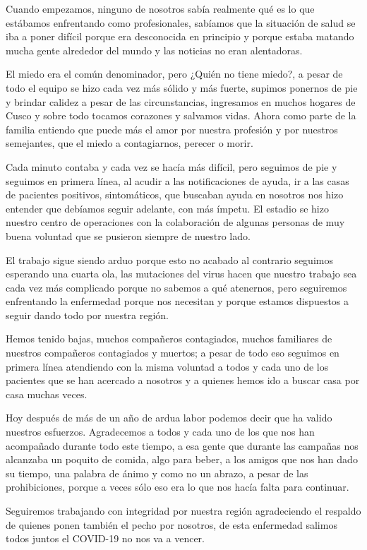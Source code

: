 \documentclass[12pt,a4paper,openany]{book}
\begin{document}
Cuando empezamos, ninguno de nosotros sabía realmente qué es lo que estábamos enfrentando como profesionales, sabíamos que la situación de salud se iba a poner difícil porque era desconocida en principio y porque estaba matando mucha gente alrededor del mundo y las noticias no eran alentadoras. 

El miedo era el común denominador, pero ¿Quién no tiene miedo?, a pesar de todo el equipo se hizo cada vez más sólido y más fuerte, supimos ponernos de pie y brindar calidez a pesar de las circunstancias, ingresamos en muchos hogares de Cusco y sobre todo tocamos corazones y salvamos vidas. 
Ahora como parte de la familia entiendo que puede más el amor por nuestra profesión y por nuestros semejantes, que el miedo a contagiarnos, perecer o morir.

Cada minuto contaba y cada vez se hacía más difícil, pero seguimos de pie y seguimos en primera línea, al acudir a las notificaciones de ayuda, ir a las casas de pacientes positivos, sintomáticos, que buscaban ayuda en nosotros nos hizo entender que debíamos seguir adelante, con más ímpetu. El estadio se hizo nuestro centro de operaciones con la colaboración de algunas personas de muy buena voluntad que se pusieron siempre de nuestro lado.

El trabajo sigue siendo arduo porque esto no acabado al contrario seguimos esperando una cuarta ola, las mutaciones del virus hacen que nuestro trabajo sea cada vez más complicado porque no sabemos a qué atenernos, pero seguiremos enfrentando la enfermedad porque nos necesitan y porque estamos dispuestos a seguir dando todo por nuestra región.

Hemos tenido bajas, muchos compañeros contagiados, muchos familiares de nuestros compañeros contagiados y muertos; a pesar de todo eso seguimos en primera línea atendiendo con la misma voluntad a todos y cada uno de los pacientes que se han acercado a nosotros y a quienes hemos ido a buscar casa por casa muchas veces.

Hoy después de más de un  año de ardua labor podemos decir que ha valido nuestros esfuerzos. Agradecemos a todos y cada uno de los que nos han acompañado durante todo este tiempo, a esa gente que durante las campañas nos alcanzaba un poquito de comida, algo para beber, a los amigos que nos han dado su tiempo, una palabra de ánimo y como no un abrazo, a pesar de las prohibiciones, porque a veces sólo eso era lo que nos hacía falta para continuar.


Seguiremos trabajando con integridad por nuestra región agradeciendo el respaldo de quienes ponen también el pecho por nosotros, de esta enfermedad salimos todos juntos el COVID-19 no nos va a vencer.
	
\end{document}
